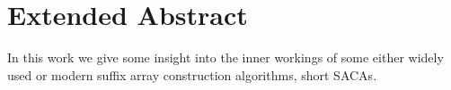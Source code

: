 \chapter*{Extended Abstract}

In  this work we give some insight into the inner workings of some either widely used or modern suffix array construction algorithms, short SACAs.

\Blindtext

